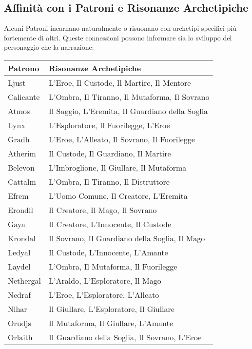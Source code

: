\begin{multicols}{2}
\subsection*{Affinità con i Patroni e Risonanze Archetipiche}

Alcuni Patroni incarnano naturalmente o risuonano con archetipi specifici più fortemente di altri. Queste connessioni possono informare sia lo sviluppo del personaggio che la narrazione:

\medskip

\noindent\begin{tabularx}{\columnwidth}{lX}
	\toprule
\rowcolor{gray!20}\textbf{Patrono} & \textbf{Risonanze Archetipiche} \\
\toprule
Ljust & L'Eroe, Il Custode, Il Martire, Il Mentore \\
\rowcolor{gray!20}Calicante & L'Ombra, Il Tiranno, Il Mutaforma, Il Sovrano \\
Atmos & Il Saggio, L'Eremita, Il Guardiano della Soglia \\
\rowcolor{gray!20}Lynx & L'Esploratore, Il Fuorilegge, L'Eroe \\
Gradh & L'Eroe, L'Alleato, Il Sovrano, Il Fuorilegge \\
\rowcolor{gray!20}Atherim & Il Custode, Il Guardiano, Il Martire \\
Belevon & L'Imbroglione, Il Giullare, Il Mutaforma \\
\rowcolor{gray!20}Cattalm & L'Ombra, Il Tiranno, Il Distruttore \\
Efrem & L'Uomo Comune, Il Creatore, L'Eremita \\
\rowcolor{gray!20}Erondil & Il Creatore, Il Mago, Il Sovrano \\
Gaya & Il Creatore, L'Innocente, Il Custode \\
\rowcolor{gray!20}Krondal & Il Sovrano, Il Guardiano della Soglia, Il Mago \\
Ledyal & Il Custode, L'Innocente, L'Amante \\
\rowcolor{gray!20}Laydel & L'Ombra, Il Mutaforma, Il Fuorilegge \\
Nethergal & L'Araldo, L'Esploratore, Il Mago \\
\rowcolor{gray!20}Nedraf & L'Eroe, L'Esploratore, L'Alleato \\
Nihar & Il Giullare, L'Esploratore, Il Giullare \\
\rowcolor{gray!20}Orudjs & Il Mutaforma, Il Giullare, L'Amante \\
Orlaith & Il Guardiano della Soglia, Il Sovrano, L'Eroe \\

\end{tabularx}
\end{multicols}
